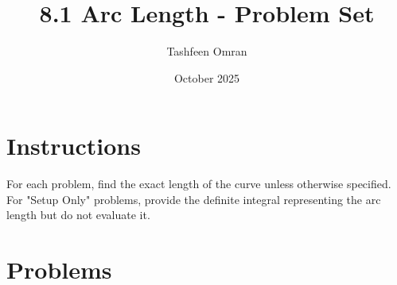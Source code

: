 \documentclass[12pt]{article}
\begin{document}
\title{8.1 Arc Length - Problem Set}
\author{Tashfeen Omran}
\date{October 2025}
\maketitle

\section*{Instructions}
For each problem, find the exact length of the curve unless otherwise specified. For "Setup Only" problems, provide the definite integral representing the arc length but do not evaluate it.

\section*{Problems}
\end{document}
